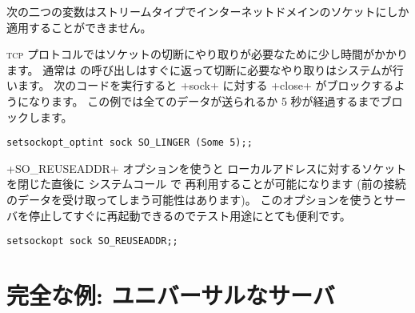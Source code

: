 \begin{example}
次の二つの変数はストリームタイプでインターネットドメインのソケットにしか
適用することができません。

\textsc{tcp} プロトコルではソケットの切断にやり取りが必要なために少し時間がかかります。
通常は  の呼び出しはすぐに返って切断に必要なやり取りはシステムが行います。
次のコードを実行すると \ml+sock+ に対する \ml+close+ がブロックするようになります。
この例では全てのデータが送られるか 5 秒が経過するまでブロックします。
%
\begin{lstlisting}
setsockopt_optint sock SO_LINGER (Some 5);;
\end{lstlisting}
%

\ml+SO_REUSEADDR+ オプションを使うと
ローカルアドレスに対するソケットを閉じた直後に システムコール  で
再利用することが可能になります (前の接続のデータを受け取ってしまう可能性はあります)。
このオプションを使うとサーバを停止してすぐに再起動できるのでテスト用途にとても便利です。
%
\begin{lstlisting}
setsockopt sock SO_REUSEADDR;;
\end{lstlisting}
\end{example}

\section{完全な例: ユニバーサルなサーバ}

